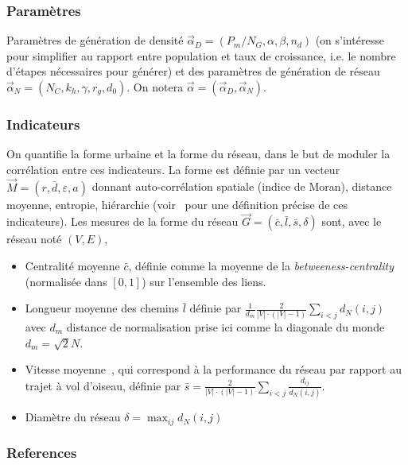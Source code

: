 \documentclass[french,11pt]{beamer}
\begin{document}
\begin{frame}
\frametitle{Paramètres}
Paramètres de génération de densité $\vec{\alpha}_D = (P_m/N_G , \alpha,\beta , n_d)$ (on s'intéresse pour simplifier au rapport entre population et taux de croissance, i.e. le nombre d'étapes nécessaires pour générer) et des paramètres de génération de réseau $\vec{\alpha}_N=(N_C,k_h,\gamma , r_g , d_0)$. On notera $\vec{\alpha} = (\vec{\alpha}_D,\vec{\alpha}_N)$.
\end{frame}


\begin{frame}
\frametitle{Indicateurs}
\small
On quantifie la forme urbaine et la forme du réseau, dans le but de moduler la corrélation entre ces indicateurs. La forme est définie par un vecteur $\vec{M}=(r,\bar{d},\varepsilon,a)$ donnant auto-corrélation spatiale (indice de Moran), distance moyenne, entropie, hiérarchie (voir~\cite{le2015forme} pour une définition précise de ces indicateurs). Les mesures de la forme du réseau $\vec{G} = (\bar{c},\bar{l},\bar{s},\delta)$ sont, avec le réseau noté $(V,E)$,
\begin{itemize}
\item Centralité moyenne $\bar{c}$, définie comme la moyenne de la \emph{betweeness-centrality} (normalisée dans $[0,1]$) sur l'ensemble des liens.
\item Longueur moyenne des chemins $\bar{l}$ définie par $\frac{1}{d_m}\frac{2}{|V|\cdot (|V|-1)}\sum_{i<j}d_N(i,j)$ avec $d_m$ distance de normalisation prise ici comme la diagonale du monde $d_m=\sqrt{2}N$.
\item Vitesse moyenne~\cite{banos2012towards}, qui correspond à la performance du réseau par rapport au trajet à vol d'oiseau, définie par $\bar{s} = \frac{2}{|V|\cdot (|V|-1)}\sum_{i<j}{\frac{d_{ij}}{d_N(i,j)}}$.
\item Diamètre du réseau $\delta = \max_{ij}d_N(i,j)$
\end{itemize}
\end{frame}





\begin{frame}[allowframebreaks]
\frametitle{References}


\end{frame}
\end{document}
